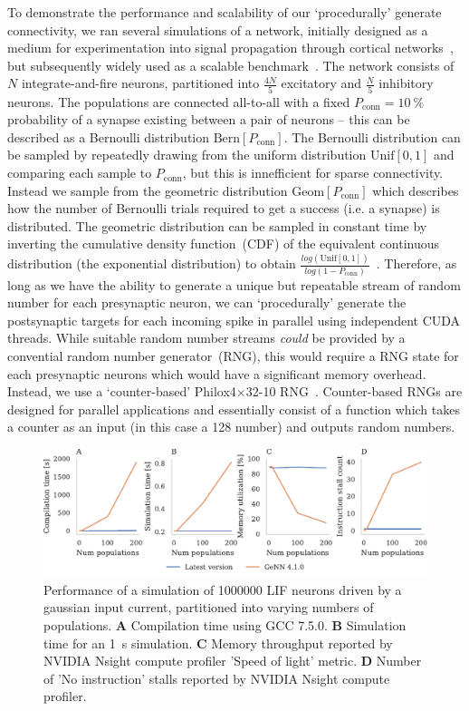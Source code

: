 \documentclass[9pt,twocolumn,twoside,lineno]{pnas-new}
\begin{document}
To demonstrate the performance and scalability of our `procedurally' generate connectivity, we ran several simulations of a network, initially designed as a medium for experimentation into signal propagation through cortical networks~\citep{Vogels2005}, but subsequently widely used as a scalable benchmark~\citep{Brette2007}.
The network consists of $N$ integrate-and-fire neurons, partitioned into $\frac{4N}{5}$ excitatory and $\frac{N}{5}$ inhibitory neurons.
The populations are connected all-to-all with a fixed $P_{\text{conn}}=\SI{10}{\percent}$ probability of a synapse existing between a pair of neurons -- this can be described as a Bernoulli distribution $\text{Bern}[P_{\text{conn}}]$.
The Bernoulli distribution can be sampled by repeatedly drawing from the uniform distribution $\text{Unif}[0, 1]$ and comparing each sample to $P_{\text{conn}}$, but this is innefficient for sparse connectivity.
Instead we sample from the geometric distribution $\text{Geom}[P_{\text{conn}}]$ which describes how the number of Bernoulli trials required to get a success (i.e. a synapse) is distributed.
The geometric distribution can be sampled in constant time by inverting the cumulative density function~(CDF) of the equivalent continuous distribution (the exponential distribution) to obtain $\frac{log(\text{Unif}[0, 1])}{log(1 - P_{\text{conn}})}$~\citep[p499]{DevroyeLuc2013}.
Therefore, as long as we have the ability to generate a unique but repeatable stream of random number for each presynaptic neuron, we can `procedurally' generate the postsynaptic targets for each incoming spike in parallel using independent CUDA threads.
While suitable random number streams \emph{could} be provided by a convential random number generator~(RNG), this would require a RNG state for each presynaptic neurons which would have a significant memory overhead.
Instead, we use a `counter-based' Philox4$\times$32-10 RNG~\citep{Salmon2011}.
Counter-based RNGs are designed for parallel applications and essentially consist of a function which takes a counter as an input (in this case a \SI{128}{\bit} number) and outputs random numbers.
\begin{figure}
    \centering
    \includegraphics{figures/merging_scaling}
    \caption{Performance of a simulation of \num{1000000} LIF neurons driven by a gaussian input current, partitioned into varying numbers of populations. 
    \textbf{A} Compilation time using GCC 7.5.0.
    \textbf{B} Simulation time for an \SI{1}{\second} simulation.
    \textbf{C} Memory throughput reported by NVIDIA Nsight compute profiler 'Speed of light' metric.
    \textbf{D} Number of 'No instruction' stalls reported by NVIDIA Nsight compute profiler.}
    \label{fig:merging_scaling}
\end{figure}
\end{document}
